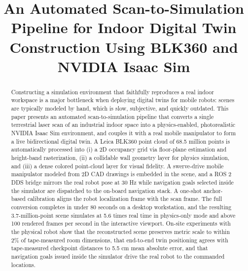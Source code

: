 \documentclass[conference]{IEEEtran}
\begin{document}
\title{An Automated Scan-to-Simulation Pipeline for Indoor Digital Twin
Construction Using BLK360 and NVIDIA Isaac Sim}

\author{
}

\maketitle

\begin{abstract}
Constructing a simulation environment that faithfully reproduces a real
indoor workspace is a major bottleneck when deploying digital twins for
mobile robots: scenes are typically modeled by hand, which is slow,
subjective, and quickly outdated. This paper presents an automated
scan-to-simulation pipeline that converts a single terrestrial laser
scan of an industrial indoor space into a physics-enabled, photorealistic
NVIDIA Isaac Sim environment, and couples it with a real mobile
manipulator to form a live bidirectional digital twin. A Leica BLK360
point cloud of 68.5 million points is automatically processed into
(i) a 2D occupancy grid via floor-plane estimation and height-band
rasterization, (ii) a collidable wall geometry layer for physics
simulation, and (iii) a dense colored point-cloud layer for visual
fidelity. A swerve-drive mobile manipulator modeled from 2D CAD drawings
is embedded in the scene, and a ROS 2 DDS bridge mirrors the real robot
pose at 30 Hz while navigation goals selected inside the simulator are
dispatched to the on-board navigation stack. A one-shot anchor-based
calibration aligns the robot localization frame with the scan frame.
The full conversion completes in under 80 seconds on a desktop
workstation, and the resulting 3.7-million-point scene simulates at
5.6 times real time in physics-only mode and above 100 rendered frames
per second in the interactive viewport. On-site experiments with the
physical robot show that the reconstructed scene preserves metric scale
to within 2\% of tape-measured room dimensions, that end-to-end twin
positioning agrees with tape-measured checkpoint distances to 5.5 cm
mean absolute error, and that navigation goals issued inside the
simulator drive the real robot to the commanded locations.
\end{abstract}
\end{document}
